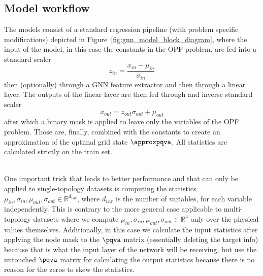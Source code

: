 \subsection*{Model workflow}

The models consist of a standard regression pipeline (with problem specific modifications) depicted in
Figure~\ref{fig:gnn_model_block_diagram}, where the input of the model, in this case the constants in the OPF problem,
are fed into a standard scaler \[z_{in} = \displaystyle\frac{x_{in} - \mu_{in}}{\sigma_{in}}\] then (optionally) through a GNN
feature extractor and then through a linear layer.
The outputs of the linear layer are then fed through and inverse standard scaler \[x_{out} = z_{out}\sigma_{out} + \mu_{out}\]
after which a binary mask is applied to leave only the variables of the OPF problem.
Those are, finally, combined with the constants to create an approximation of the optimal grid state $\approxpqva$.
All statistics are calculated strictly on the train set.

\mbox{}\\


One important trick that leads to better performance and that can only be applied to single-topology datasets is computing the statistics
$\mu_{in}, \sigma_{in}, \mu_{out}, \sigma_{out} \in \mathbb{R}^{d_{var}}$, where $d_{var}$ is the number of variables, for each variable
independently.
This is contrary to the more general case applicable to multi-topology datasets where we compute
$\mu_{in}, \sigma_{in}, \mu_{out}, \sigma_{out} \in \mathbb{R}^4$ only over the physical values themselves.
Additionally, in this case we calculate the input statistics after applying the node mask to the $\pqva$ matrix
(essentially deleting the target info) because that is what the input layer of the network will be receiving, but
use the untouched $\pqva$ matrix for calculating the output statistics because there is no reason for the zeros
to skew the statistics.

\mbox{}\\